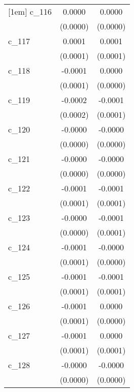 {\begin{tabular}{l*{2}{c}}
[1em]
c\_116       &      0.0000        &      0.0000        \\
            &    (0.0000)        &    (0.0000)        \\
[1em]
c\_117       &      0.0001        &      0.0001        \\
            &    (0.0001)        &    (0.0001)        \\
[1em]
c\_118       &     -0.0001        &      0.0000        \\
            &    (0.0001)        &    (0.0000)        \\
[1em]
c\_119       &     -0.0002        &     -0.0001        \\
            &    (0.0002)        &    (0.0001)        \\
[1em]
c\_120       &     -0.0000        &     -0.0000        \\
            &    (0.0000)        &    (0.0000)        \\
[1em]
c\_121       &     -0.0000        &     -0.0000        \\
            &    (0.0000)        &    (0.0000)        \\
[1em]
c\_122       &     -0.0001        &     -0.0001        \\
            &    (0.0001)        &    (0.0001)        \\
[1em]
c\_123       &     -0.0000        &     -0.0001        \\
            &    (0.0000)        &    (0.0001)        \\
[1em]
c\_124       &     -0.0001        &     -0.0000        \\
            &    (0.0001)        &    (0.0000)        \\
[1em]
c\_125       &     -0.0001        &     -0.0001        \\
            &    (0.0001)        &    (0.0001)        \\
[1em]
c\_126       &     -0.0001        &      0.0000        \\
            &    (0.0001)        &    (0.0000)        \\
[1em]
c\_127       &     -0.0001        &      0.0000        \\
            &    (0.0001)        &    (0.0001)        \\
[1em]
c\_128       &     -0.0000        &     -0.0000        \\
            &    (0.0000)        &    (0.0000)        \\

\end{tabular}}
